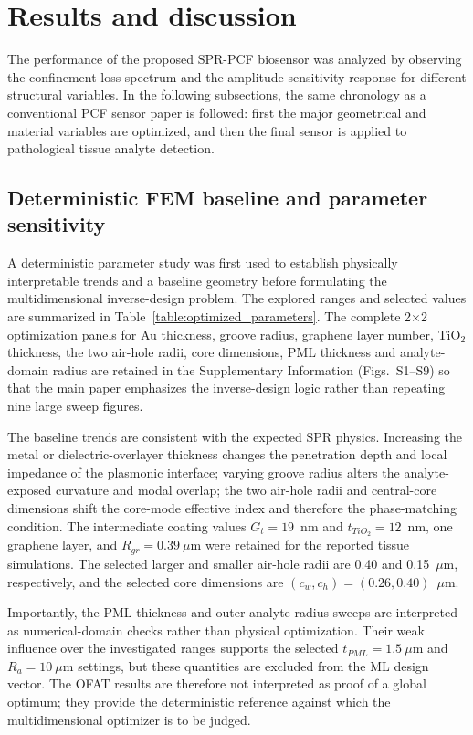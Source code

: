 \documentclass[5p,times,twocolumn]{elsarticle}
\def\mathrm#1{#1}%
\begin{document}
\section{Results and discussion}
\label{sec:results}

The performance of the proposed SPR-PCF biosensor was analyzed by observing the confinement-loss spectrum and the amplitude-sensitivity response for different structural variables. In the following subsections, the same chronology as a conventional PCF sensor paper is followed: first the major geometrical and material variables are optimized, and then the final sensor is applied to pathological tissue analyte detection.

\subsection{Deterministic FEM baseline and parameter sensitivity}
\label{subsec:fem_baseline}

A deterministic parameter study was first used to establish physically interpretable trends and a baseline geometry before formulating the multidimensional inverse-design problem. The explored ranges and selected values are summarized in Table~\ref{table:optimized_parameters}. The complete 2$\times$2 optimization panels for Au thickness, groove radius, graphene layer number, TiO$_2$ thickness, the two air-hole radii, core dimensions, PML thickness and analyte-domain radius are retained in the Supplementary Information (Figs.~S1--S9) so that the main paper emphasizes the inverse-design logic rather than repeating nine large sweep figures.

The baseline trends are consistent with the expected SPR physics. Increasing the metal or dielectric-overlayer thickness changes the penetration depth and local impedance of the plasmonic interface; varying groove radius alters the analyte-exposed curvature and modal overlap; the two air-hole radii and central-core dimensions shift the core-mode effective index and therefore the phase-matching condition. The intermediate coating values $G_t=19$~nm and $t_{\mathrm{TiO_2}}=12$~nm, one graphene layer, and $R_{gr}=0.39~\mu$m were retained for the reported tissue simulations. The selected larger and smaller air-hole radii are 0.40 and 0.15~$\mu$m, respectively, and the selected core dimensions are $(c_w,c_h)=(0.26,0.40)$~$\mu$m.

Importantly, the PML-thickness and outer analyte-radius sweeps are interpreted as numerical-domain checks rather than physical optimization. Their weak influence over the investigated ranges supports the selected $t_{\mathrm{PML}}=1.5~\mu$m and $R_a=10~\mu$m settings, but these quantities are excluded from the ML design vector. The OFAT results are therefore not interpreted as proof of a global optimum; they provide the deterministic reference against which the multidimensional optimizer is to be judged.
\end{document}
